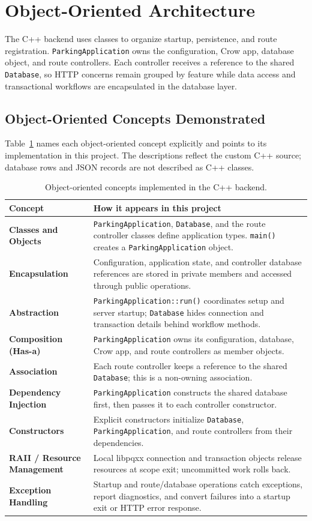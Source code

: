 \documentclass[12pt,a4paper]{article}
\begin{document}
\section{Object-Oriented Architecture}
The C++ backend uses classes to organize startup, persistence, and route
registration. \texttt{ParkingApplication} owns the configuration, Crow app,
database object, and route controllers. Each controller receives a reference
to the shared \texttt{Database}, so HTTP concerns remain grouped by feature
while data access and transactional workflows are encapsulated in the database
layer.

\subsection{Object-Oriented Concepts Demonstrated}
Table~\ref{tab:oop-concepts} names each object-oriented concept explicitly and
points to its implementation in this project. The descriptions reflect the
custom C++ source; database rows and JSON records are not described as C++
classes.

\begin{table}[H]
\centering\small
\begin{tabularx}{\textwidth}{@{}>{\bfseries}p{1.65in}X@{}}
\toprule
Concept & How it appears in this project \\
\midrule
Classes and Objects & \texttt{ParkingApplication}, \texttt{Database}, and the route controller classes define application types. \texttt{main()} creates a \texttt{ParkingApplication} object. \\
Encapsulation & Configuration, application state, and controller database references are stored in private members and accessed through public operations. \\
Abstraction & \texttt{ParkingApplication::run()} coordinates setup and server startup; \texttt{Database} hides connection and transaction details behind workflow methods. \\
Composition (Has-a) & \texttt{ParkingApplication} owns its configuration, database, Crow app, and route controllers as member objects. \\
Association & Each route controller keeps a reference to the shared \texttt{Database}; this is a non-owning association. \\
Dependency Injection & \texttt{ParkingApplication} constructs the shared database first, then passes it to each controller constructor. \\
Constructors & Explicit constructors initialize \texttt{Database}, \texttt{ParkingApplication}, and route controllers from their dependencies. \\
RAII / Resource Management & Local libpqxx connection and transaction objects release resources at scope exit; uncommitted work rolls back. \\
Exception Handling & Startup and route/database operations catch exceptions, report diagnostics, and convert failures into a startup exit or HTTP error response. \\
\bottomrule
\end{tabularx}
\caption{Object-oriented concepts implemented in the C++ backend.}
\label{tab:oop-concepts}
\end{table}
\end{document}
